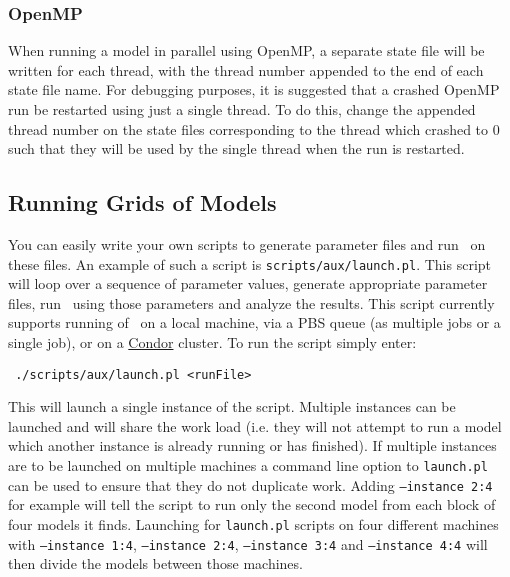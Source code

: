 \subsubsection{OpenMP}

When running a model in parallel using OpenMP, a separate state file will be written for each thread, with the thread number appended to the end of each state file name. For debugging purposes, it is suggested that a crashed OpenMP run be restarted using just a single thread. To do this, change the appended thread number on the state files corresponding to the thread which crashed to 0 such that they will be used by the single thread when the run is restarted.

\subsection{Running Grids of Models}\label{sec:RunningGrids}

You can easily write your own scripts to generate parameter files and run \glc\ on these files. An example of such a script is {\tt scripts/aux/launch.pl}. This script will loop over a sequence of parameter values, generate appropriate parameter files, run \glc\ using those parameters and analyze the results. This script currently supports running of \glc\ on a local machine, via a PBS queue (as multiple jobs or a single job), or on a \href{http://www.cs.wisc.edu/condor/}{{\sc Condor}} cluster. To run the script simply enter:
\begin{verbatim}
 ./scripts/aux/launch.pl <runFile>
\end{verbatim}
This will launch a single instance of the script. Multiple instances can be launched and will share the work load (i.e. they will not attempt to run a model which another instance is already running or has finished). If multiple instances are to be launched on multiple machines a command line option to {\tt launch.pl} can be used to ensure that they do not duplicate work. Adding {\tt --instance 2:4} for example will tell the script to run only the second model from each block of four models it finds. Launching for {\tt launch.pl} scripts on four different machines with {\tt --instance 1:4}, {\tt --instance 2:4}, {\tt --instance 3:4} and {\tt --instance 4:4} will then divide the models between those machines.

